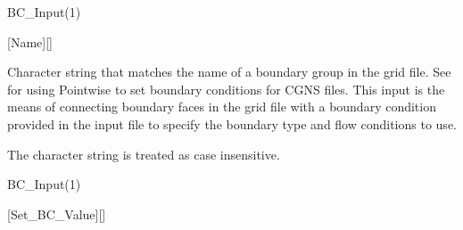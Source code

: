 
\begin{nmldescitem}
BC_Input(1)%
\end{nmldescitem}
[Name][]

\begin{nmldescbody}
Character string that matches the name of a boundary group in the grid file.
%
See  for using Pointwise
to set boundary conditions for CGNS files.
%
This input is the means of connecting boundary faces in the grid file with a
boundary condition provided in the input file to specify the boundary type and
flow conditions to use.

\NOTE
The character string is treated as case insensitive.
\end{nmldescbody}


\FINALFIX{\newpage}
\begin{nmldescitem}
BC_Input(1)%
\end{nmldescitem}
[Set\_BC\_Value][]

